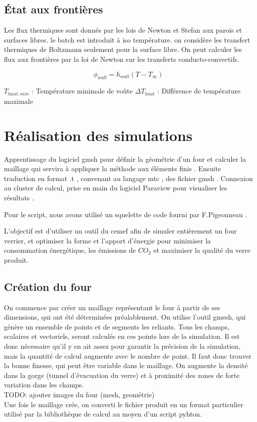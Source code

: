 \documentclass[12pt, a4paper, french, BCOR = 0pt, DIV = 10]{scrartcl}
\begin{document}
    \subsection{État aux frontières}
    
    Les flux thermiques sont donnés par les lois de Newton et Stefan aux parois et surfaces libres. le batch est introduit à iso température. on considère les transfert thermiques de Boltzmann seulement pour la surface libre.
    On peut calculer les flux aux frontières par la loi de Newton sur les transferts conducto-convectifs.\\ 
    \begin{center}
        $$
        \phi_{wall} = h_{wall} (T - T_{\infty})
        $$
    \end{center}
    
    
    
    $T_{haut, min}$ : Température minimale de voûte
    \break
    $\Delta T_{haut}$ : Différence de température maximale


	
	\section{Réalisation des simulations}
 	\raggedright
	Apprentissage du logiciel gmsh pour définir la géométrie d'un four et calculer la maillage qui servira à appliquer la méthode aux éléments finis . Ensuite traduction en format .t , convenant au langage mtc , des fichier gmsh . 
	Connexion au cluster de calcul, prise en main du logiciel Paraview pour visualiser les résultats .
	
	Pour le script, nous avons utilisé un squelette de code fourni par F.Pigeonneau .

    L'objectif est d'utiliser un outil du cemef afin de simuler entièrement un four verrier, et optimiser la forme et l'apport d'énergie pour minimiser la consommation énergétique, les émissions de $CO_{2}$ et maximiser la qualité du verre produit.

    \subsection{Création du four}
    On commence par créer un maillage représentant le four à partir de ses dimensions, qui ont été déterminées préalablement. On utilise l'outil gmesh, qui génère un ensemble de points et de segments les reliants. Tous les champs, scalaires et vectoriels, seront calculés en ces points lors de la simulation. Il est donc nécessaire qu'il y en ait assez pour garantir la précision de la simulation, mais la quantité de calcul augmente avec le nombre de point. Il faut donc trouver la bonne finesse, qui peut être variable dans le maillage. On augmente la densité dans la gorge (tunnel d'évacuation du verre) et à proximité des zones de forte variation dans les champs.\\
    TODO: ajouter images du four (mesh, geométrie)\\
    Une fois le maillage crée, on converti le fichier produit en un format particulier utilisé par la bibliothèque de calcul au moyen d'un script pyhton.
\end{document}
